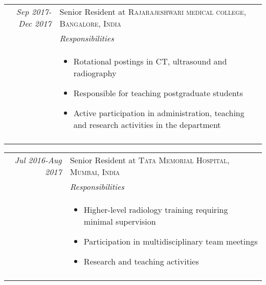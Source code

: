 \documentclass[a4paper,10pt]{article}
\begin{document}
\begin{tabular}{r|p{11cm}}
\emph{Sep 2017-Dec 2017} & Senior Resident at \textsc{Rajarajeshwari medical college, Bangalore, India} \\
 
\textsc{}&\emph{Responsibilities}\\&\footnotesize{

\begin{itemize} 
        \vspace{-0.2cm}\item Rotational postings in CT, ultrasound and radiography
        \vspace{-0.2cm}\item Responsible for teaching postgraduate students
        \vspace{-0.2cm}\item Active participation in administration, teaching and research activities in the department
     \end{itemize}
}\\\multicolumn{2}{c}{} \\
\end{tabular}
\vspace{-0.2cm}

\begin{tabular}{r|p{11cm}}
\emph{Jul 2016-Aug 2017} & Senior Resident at \textsc{Tata Memorial Hospital, Mumbai, India} \\
 
\textsc{}&\emph{Responsibilities}\\&\footnotesize{

\begin{itemize} 
        \vspace{-0.2cm}\item Higher-level radiology training requiring minimal supervision
        \vspace{-0.2cm}\item Participation in multidisciplinary team meetings
        \vspace{-0.2cm}\item Research and teaching activities
     \end{itemize}
}\\\multicolumn{2}{c}{} \\
\end{tabular}
\vspace{-0.2cm}

\end{document}
